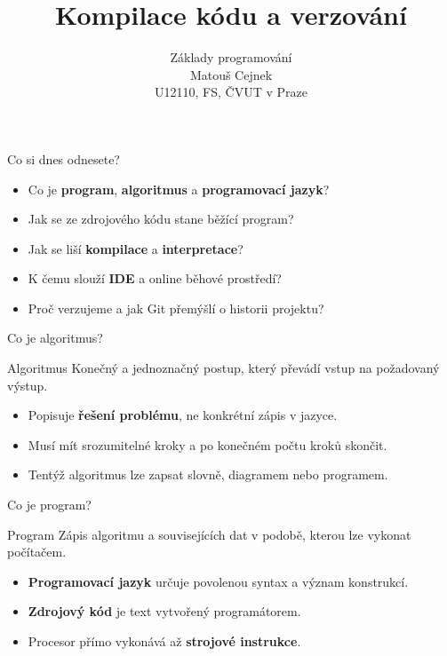 \documentclass[aspectratio=169]{beamer}
\title{Kompilace kódu a verzování}
\subtitle{Základy programování\\Matouš Cejnek\\U12110, FS, ČVUT v Praze}
\author{}
\institute{}
\date{}
\newcommand{\term}[1]{\textcolor{CodeBlue}{\textbf{#1}}}
\begin{document}
\begin{frame}
  \clearpage\thispagestyle{empty}\titlepage
\end{frame}

\begin{frame}{Co si dnes odnesete?}
  \begin{itemize}
    \item Co je \term{program}, \term{algoritmus} a \term{programovací jazyk}?
    \item Jak se ze zdrojového kódu stane běžící program?
    \item Jak se liší \term{kompilace} a \term{interpretace}?
    \item K čemu slouží \term{IDE} a online běhové prostředí?
    \item Proč verzujeme a jak Git přemýšlí o historii projektu?
  \end{itemize}
\end{frame}

\begin{frame}{Co je algoritmus?}
  \begin{block}{Algoritmus}
    Konečný a jednoznačný postup, který převádí vstup na požadovaný výstup.
  \end{block}
  \begin{itemize}
    \item Popisuje \textbf{řešení problému}, ne konkrétní zápis v jazyce.
    \item Musí mít srozumitelné kroky a po konečném počtu kroků skončit.
    \item Tentýž algoritmus lze zapsat slovně, diagramem nebo programem.
  \end{itemize}
\end{frame}

\begin{frame}{Co je program?}
  \begin{block}{Program}
    Zápis algoritmu a souvisejících dat v podobě, kterou lze vykonat počítačem.
  \end{block}
  \begin{itemize}
    \item \term{Programovací jazyk} určuje povolenou syntax a význam konstrukcí.
    \item \term{Zdrojový kód} je text vytvořený programátorem.
    \item Procesor přímo vykonává až \term{strojové instrukce}.
  \end{itemize}
\end{frame}
\end{document}

